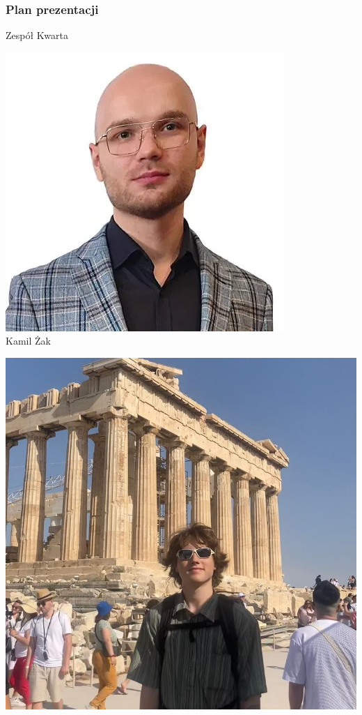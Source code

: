 \frame{\titlepage}

\begin{frame}
\frametitle{Plan prezentacji}
\tableofcontents[pausesections]
\end{frame}


\begin{frame}[t]{Zespół Kwarta}
\centering
\begin{minipage}{0.22\linewidth}
\centering
\includegraphics[width=\linewidth]{img/KZ}\\
\scriptsize Kamil Żak \\
\scriptsize {}
\end{minipage}\pause
\hspace{2em}
\begin{minipage}{0.22\linewidth}
\centering
\includegraphics[width=\linewidth]{img/AK}\\

\end{minipage}
\end{frame}
